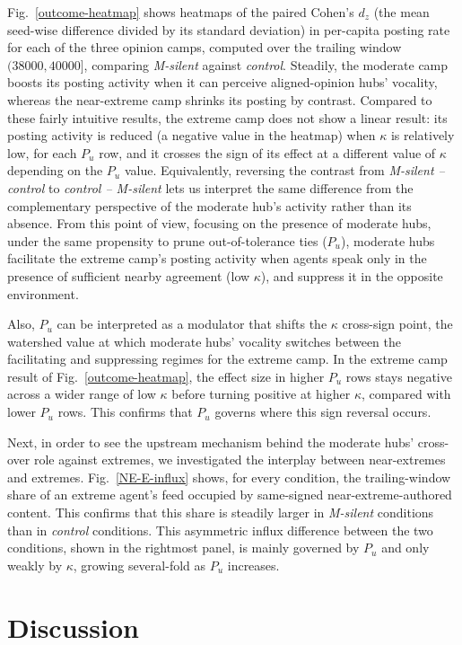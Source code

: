 \documentclass{svproc}
\def\VCR{\kappa}                 %
\begin{document}
Fig.~\ref{outcome-heatmap} shows heatmaps of the paired
Cohen's $d_z$ (the mean seed-wise difference divided by its standard
deviation) in per-capita posting rate for each of
the three opinion camps, computed over the trailing window
$(38000, 40000]$, comparing \emph{M-silent} against
\emph{control}.
Steadily, the moderate camp boosts its posting
activity when it can perceive aligned-opinion
hubs' vocality, whereas the near-extreme camp
shrinks its posting by contrast.
Compared to these fairly intuitive results, the
extreme camp does not show a linear result: its
posting activity is reduced (a negative value in
the heatmap) when $\VCR$ is relatively low, for
each $P_u$ row, and it crosses the sign of its
effect at a different value of $\VCR$ depending on
the $P_u$ value.
Equivalently, reversing the contrast from
\emph{M-silent -- control} to \emph{control --
M-silent} lets us interpret the same difference
from the complementary perspective of the moderate
hub's activity rather than its absence. 
From this point of view, focusing on the presence
of moderate hubs, under the same propensity to
prune out-of-tolerance ties ($P_u$), moderate hubs
facilitate the extreme camp's posting activity
when agents speak only in the presence of
sufficient nearby agreement (low $\VCR$), and
suppress it in the opposite environment.

Also, $P_u$ can be interpreted as a modulator that
shifts the $\VCR$ cross-sign point, the watershed
value at which moderate hubs' vocality switches
between the facilitating and suppressing regimes
for the extreme camp.
In the extreme camp result of Fig.~\ref{outcome-heatmap},
the effect size in higher $P_u$ rows stays
negative across a wider range of low $\VCR$ before
turning positive at higher $\VCR$, compared with
lower $P_u$ rows.
This confirms that $P_u$ governs where this
sign reversal occurs.

Next, in order to see the upstream mechanism behind the
moderate hubs' cross-over role against extremes,
we investigated the interplay between near-extremes and
extremes.
Fig.~\ref{NE-E-influx} shows, for every condition, the trailing-window
share of an extreme agent's feed occupied by same-signed near-extreme-authored
content. This confirms that this share is steadily larger in
\emph{M-silent} conditions than in \emph{control} conditions.
This asymmetric influx difference between the two conditions,
shown in the rightmost panel, is mainly governed by $P_u$ and only
weakly by $\VCR$, growing several-fold as $P_u$ increases.

\section{Discussion}\label{sec:discussion}
\end{document}
